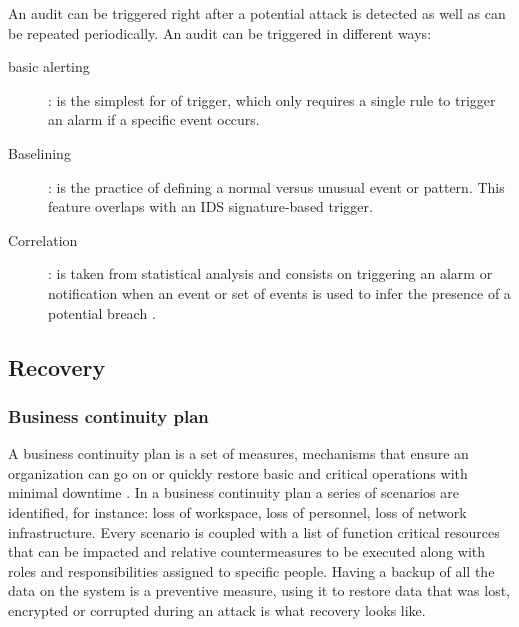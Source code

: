 An audit can be triggered right after a potential attack is detected as well as
can be repeated periodically. An audit can be triggered in different ways:
\begin{description}
  \item [basic alerting]: is the simplest for of trigger, which only requires
  a single rule to trigger an alarm if a specific event occurs.
  \item [Baselining]: is the practice of defining a normal versus unusual
  event or pattern. This feature overlaps with an IDS signature-based trigger.
  \item [Correlation]: is taken from statistical analysis and consists on
  triggering an alarm or notification when an event or set of events is used to
  infer the presence of a potential breach \cite{WS15}.
\end{description}

\subsection{Recovery}

\subsubsection{Business continuity plan}
A business continuity plan is a set of measures, mechanisms that ensure an
organization can go on or quickly restore basic and critical operations
with minimal downtime \cite{TW10}. In a business continuity plan a series of
scenarios are identified, for instance: loss of workspace, loss of personnel,
loss of network infrastructure. Every scenario is coupled with a list of
function critical resources that can be impacted and relative countermeasures
to be executed along with roles and responsibilities assigned to
specific people. Having a backup of all the data on the system
is a preventive measure, using it to restore data that was lost, encrypted or
corrupted during an attack is what recovery looks like.


